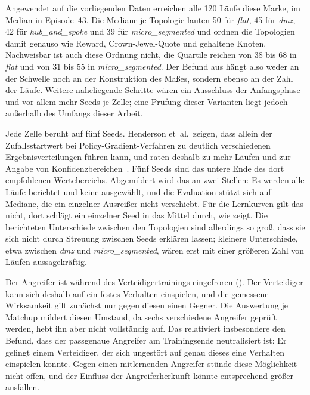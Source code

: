 Angewendet auf die vorliegenden Daten erreichen alle 120 Läufe diese Marke, im
Median in Episode~43. Die Mediane je Topologie lauten 50 für \emph{flat}, 45
für \emph{dmz}, 42 für \emph{hub\_and\_spoke} und 39 für
\emph{micro\_segmented} und ordnen die Topologien damit genauso wie Reward,
Crown-Jewel-Quote und gehaltene Knoten. Nachweisbar ist auch diese Ordnung
nicht, die Quartile reichen von 38 bis 68 in \emph{flat} und von 31 bis 55 in
\emph{micro\_segmented}. Der Befund aus  hängt also
weder an der Schwelle noch an der Konstruktion des Maßes, sondern ebenso an der
Zahl der Läufe. Weitere naheliegende Schritte wären ein Ausschluss der
Anfangsphase und vor allem mehr Seeds je Zelle; eine Prüfung dieser
Varianten liegt jedoch außerhalb des Umfangs dieser Arbeit.

Jede Zelle beruht auf fünf Seeds. Henderson et~al.\ zeigen, dass allein der
Zufallsstartwert bei Policy-Gradient-Verfahren zu deutlich verschiedenen
Ergebnisverteilungen führen kann, und raten deshalb zu mehr Läufen und zur
Angabe von Konfidenzbereichen~\cite{henderson2019deepreinforcementlearningmatters}.
Fünf Seeds sind das untere Ende des dort empfohlenen Wertebereichs. Abgemildert wird das an
zwei Stellen: Es werden alle Läufe berichtet und keine ausgewählt, und die
Evaluation stützt sich auf Mediane, die ein einzelner Ausreißer nicht
verschiebt. Für die Lernkurven gilt das nicht, dort schlägt ein einzelner Seed
in das Mittel durch, wie  zeigt. Die berichteten
Unterschiede zwischen den Topologien sind allerdings so groß, dass sie sich
nicht durch Streuung zwischen Seeds erklären lassen; kleinere Unterschiede, etwa
zwischen \emph{dmz} und \emph{micro\_segmented}, wären erst mit einer
größeren Zahl von Läufen aussagekräftig.

Der Angreifer ist während des Verteidigertrainings eingefroren
(). Der Verteidiger kann sich deshalb auf ein festes
Verhalten einspielen, und die gemessene Wirksamkeit gilt zunächst nur gegen
diesen einen Gegner. Die Auswertung je Matchup mildert diesen Umstand, da sechs
verschiedene Angreifer geprüft werden, hebt ihn aber nicht
vollständig auf. Das
relativiert insbesondere den Befund, dass der passgenaue Angreifer am
Trainingsende neutralisiert ist: Er gelingt einem Verteidiger, der sich
ungestört auf genau dieses eine Verhalten einspielen konnte. Gegen einen
mitlernenden Angreifer stünde diese Möglichkeit nicht offen, und der
Einfluss der Angreiferherkunft könnte entsprechend größer ausfallen.

